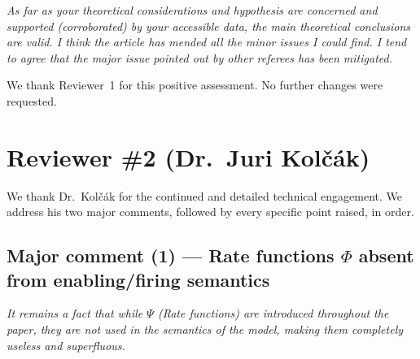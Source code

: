 \documentclass[11pt,letterpaper]{article}
\newcommand{\rquote}[1]{\begin{mdframed}[style=reviewquote]\textit{#1}\end{mdframed}}
\begin{document}
\rquote{As far as your theoretical considerations and hypothesis are concerned
and supported (corroborated) by your accessible data, the main theoretical
conclusions are valid. I think the article has mended all the minor issues I
could find. I tend to agree that the major issue pointed out by other referees
has been mitigated.}

We thank Reviewer~1 for this positive assessment. No further changes were
requested.

\bigskip

\section*{Reviewer \#2 (Dr.\ Juri Kolč{\'a}k)}

We thank Dr.\ Kolč{\'a}k for the continued and detailed technical engagement.
We address his two major comments, followed by every specific point raised, in order.

\subsection*{Major comment (1) --- Rate functions $\Phi$ absent from enabling/firing semantics}

\rquote{It remains a fact that while $\Psi$ (Rate functions) are introduced
throughout the paper, they are not used in the semantics of the model,
making them completely useless and superfluous.}
\end{document}
